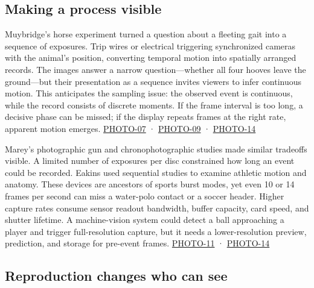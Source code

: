 \subsection{Making a process visible}\label{04-visual-computing-ii-ch034-making-a-process-visible}

\hypertarget{04-visual-computing-ii-ch034-making-a-process-visible}{}

Muybridge's horse experiment turned a question about a fleeting gait into a sequence of exposures. Trip wires or electrical triggering synchronized cameras with the animal's position, converting temporal motion into spatially arranged records. The images answer a narrow question---whether all four hooves leave the ground---but their presentation as a sequence invites viewers to infer continuous motion. This anticipates the sampling issue: the observed event is continuous, while the record consists of discrete moments. If the frame interval is too long, a decisive phase can be missed; if the display repeats frames at the right rate, apparent motion emerges. \hyperref[04-visual-computing-ii-ch036-photo-07---photography-session-07]{PHOTO-07} · \hyperref[04-visual-computing-ii-ch036-photo-09---photography-session-09]{PHOTO-09} · \hyperref[04-visual-computing-ii-ch036-photo-14---photography-session-14]{PHOTO-14}

Marey's photographic gun and chronophotographic studies made similar tradeoffs visible. A limited number of exposures per disc constrained how long an event could be recorded. Eakins used sequential studies to examine athletic motion and anatomy. These devices are ancestors of sports burst modes, yet even 10 or 14 frames per second can miss a water-polo contact or a soccer header. Higher capture rates consume sensor readout bandwidth, buffer capacity, card speed, and shutter lifetime. A machine-vision system could detect a ball approaching a player and trigger full-resolution capture, but it needs a lower-resolution preview, prediction, and storage for pre-event frames. \hyperref[04-visual-computing-ii-ch036-photo-11---photography-session-11]{PHOTO-11} · \hyperref[04-visual-computing-ii-ch036-photo-14---photography-session-14]{PHOTO-14}

\subsection{Reproduction changes who can see}\label{04-visual-computing-ii-ch034-reproduction-changes-who-can-see}

\hypertarget{04-visual-computing-ii-ch034-reproduction-changes-who-can-see}{}

